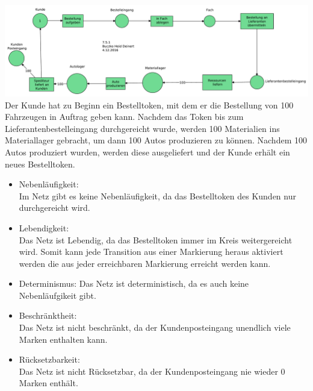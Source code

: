 \documentclass[a4paper,12pt]{scrartcl}
\begin{document}
\subsection{}
\subsubsection{}
\includegraphics[scale=0.4]{G-6-A-07-Netz2-Buczko_Heid_Deinert.pdf}\\
Der Kunde hat zu Beginn ein Bestelltoken, mit dem er 
die Bestellung von 100 Fahrzeugen in Auftrag geben 
kann. Nachdem das Token bis zum Lieferantenbestelleingang durchgereicht wurde,
werden 100 Materialien ins Materiallager gebracht,
um dann 100 Autos produzieren zu können.
Nachdem 100 Autos produziert wurden, werden diese ausgeliefert
und der Kunde erhält ein neues Bestelltoken.

\begin{itemize}
  \item{Nebenläufigkeit:}\\
  Im Netz gibt es keine Nebenläufigkeit, da das Bestelltoken des Kunden nur durchgereicht wird.
  \item{Lebendigkeit:}\\
  Das Netz ist Lebendig, da das Bestelltoken immer im Kreis weitergereicht wird. Somit kann jede Transition aus einer Markierung heraus aktiviert werden die aus jeder erreichbaren Markierung erreicht werden kann.
  \item{Determinismus:}
  Das Netz ist deterministisch, da es auch keine Nebenläufgikeit gibt.
  \item{Beschränktheit:}\\
  Das Netz ist nicht beschränkt, da der Kundenposteingang unendlich viele Marken enthalten kann.
  \item{Rücksetzbarkeit:}\\
  Das Netz ist nicht Rücksetzbar, da der Kundenposteingang nie wieder 0 Marken enthält.
\end{itemize}

\end{document}
